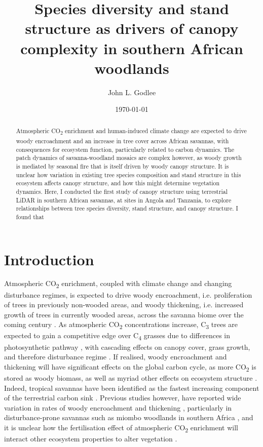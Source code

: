 \documentclass[11pt,a4paper]{article}
\title{Species diversity and stand structure as drivers of canopy complexity in southern African woodlands}
\author{John L. Godlee}
\date{\today}
\begin{document}
\maketitle{}

\linenumbers

\begin{abstract}
Atmospheric CO\textsubscript{2} enrichment and human-induced climate change are expected to drive woody encroachment and an increase in tree cover across African savannas, with consequences for ecosystem function, particularly related to carbon dynamics. The patch dynamics of savanna-woodland mosaics are complex however, as woody growth is mediated by seasonal fire that is itself driven by woody canopy structure. It is unclear how variation in existing tree species composition and stand structure in this ecosystem affects canopy structure, and how this might determine vegetation dynamics. Here, I conducted the first study of canopy structure using terrestrial LiDAR in southern African savannas, at sites in Angola and Tanzania, to explore relationships between tree species diversity, stand structure, and canopy structure. I found that 
\end{abstract}

\section{Introduction}

Atmospheric CO\textsubscript{2} enrichment, coupled with climate change and changing disturbance regimes, is expected to drive woody encroachment, i.e. proliferation of trees in previously non-wooded areas, and woody thickening, i.e. increased growth of trees in currently wooded areas, across the savanna biome over the coming century \citep{Criado2020, Stevens2016, Mitchard2013}. As atmospheric CO\textsubscript{2} concentrations increase, C\textsubscript{3} trees are expected to gain a competitive edge over C\textsubscript{4} grasses due to differences in photosynthetic pathway \citep{Buitenwerf2012}, with cascading effects on canopy cover, grass growth, and therefore disturbance regime \citep{Bond2012}. If realised, woody encroachment and thickening will have significant effects on the global carbon cycle, as more CO\textsubscript{2} is stored as woody biomass, as well as myriad other effects on ecosystem structure \citep{Donohue2013}. Indeed, tropical savannas have been identified as the fastest increasing component of the terrestrial carbon sink \citep{Sitch2015}. Previous studies however, have reported wide variation in rates of woody encroachment and thickening \citep{Mitchard2013}, particularly in disturbance-prone savannas such as miombo woodlands in southern Africa \citep{Lewis2009}, and it is unclear how the fertilisation effect of atmospheric CO\textsubscript{2} enrichment will interact other ecosystem properties to alter vegetation \citep{Korner2017, Reich2014}.
\end{document}
